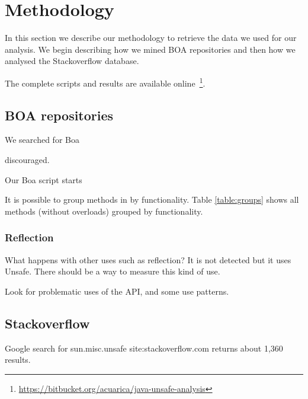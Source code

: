 
\section{Methodology} \label{sec:methodology}

In this section we describe our methodology to retrieve the data we used for our analysis.
We begin describing how we mined BOA repositories and then how we analysed the Stackoverflow database.

The complete scripts and results are available online~\footnote{\url{https://bitbucket.org/acuarica/java-unsafe-analysis}}.

\subsection{BOA repositories}

We searched for Boa \cite{Dyer-Nguyen-Rajan-Nguyen-13}

 discouraged. 

Our Boa script starts 

It is possible to group methods in \smu{} by functionality.
Table \ref{table:groups} shows all methods (without overloads) grouped by functionality.




\subsubsection*{Reflection}


What happens with other uses such as reflection? It is not detected but it uses Unsafe. There should be a way to measure this kind of use.

Look for problematic uses of the API, and some use patterns.



\subsection{Stackoverflow}

Google search for sun.misc.unsafe site:stackoverflow.com
returns about 1,360 results.
